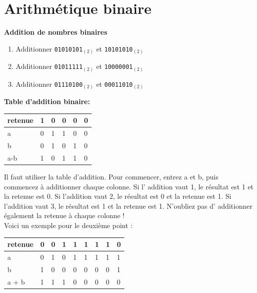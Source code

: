 \section{Arithmétique binaire}

\begin{Exercice}[15 minutes] \textbf{Addition de nombres binaires}
    \begin{enumerate}
        \item Additionner \lstinline{01010101}$_{(2)}$ et \lstinline{10101010}$_{(2)}$
        \item Additionner \lstinline{01011111}$_{(2)}$ et \lstinline{10000001}$_{(2)}$
        \item Additionner \lstinline{01110100}$_{(2)}$ et \lstinline{00011010}$_{(2)}$
    \end{enumerate}
    \begin{conseil}
\textbf{Table d'addition binaire:}\\
        \begin{tabular}{| C{0.1\textwidth} | C{0.1\textwidth} | C{0.1\textwidth} | C{0.1\textwidth} | C{0.1\textwidth} | C{0.1\textwidth} |} 
            \hline
            retenue & 1 & 0 & 0 & 0 & 0 \\ [0.5ex] 
            \hline
            a & 0 & 1 & 1 & 0 & 0 \\ [0.5ex] 
            \hline
            b & 0 & 1 & 0 & 1 & 0 \\ [0.5ex] 
            \hline
            a-b & 1 & 0 & 1 & 1 & 0 \\ [0.5ex] 
            \hline
        \end{tabular}
    \end{conseil}
    
    \begin{solution}
        Il faut utiliser la table d'addition. Pour commencer, entrez a et b, puis commencez à additionner chaque colonne. Si l' addition vaut 1, le résultat est 1 et la retenue est 0. Si l'addition vaut 2, le résultat est 0 et la retenue est 1. Si l'addition vaut 3, le résultat est 1 et la retenue est 1. N'oubliez pas d' additionner également la retenue à chaque colonne ! \\
        
Voici un exemple pour le deuxième point : \\

        \begin{tabular}{| C{0.1\textwidth} | C{0.1\textwidth} | C{0.1\textwidth} | C{0.1\textwidth} | C{0.1\textwidth} | C{0.1\textwidth} | C{0.1\textwidth} | C{0.1\textwidth} | C{0.1\textwidth} |} 
            \hline
	    retenue & 0 & 0 & 1 & 1 & 1 & 1 & 1 & 0 \\ [0.5ex]
	    \hline
            a & 0 & 1 & 0 & 1 & 1 & 1 & 1 & 1 \\ [0.5ex] 
            \hline
            b & 1 & 0 & 0 & 0 & 0 & 0 & 0 & 1 \\ [0.5ex] 
            \hline
            a + b & 1 & 1 & 1 & 0 & 0 & 0 & 0 & 0 \\ [0.5ex]
            \hline
        \end{tabular} \\
        

\end{solution}
\end{Exercice}
